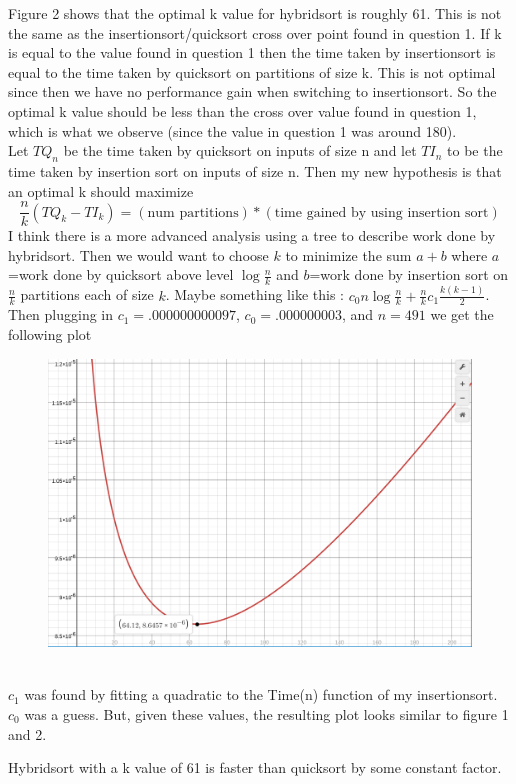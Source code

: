 \documentclass[12pt]{article}
\theoremstyle{definition}
\newenvironment{question}[1]
  {\renewcommand\theinnercustomthm{#1}\innercustomthm}
  {\endinnercustomthm}
\begin{document}
\begin{question}{Discussion}
    Figure 2 shows that the optimal k value for hybridsort is roughly 61.
    This is not the same as the insertionsort/quicksort cross over point found in question 1.
    If k is equal to the value found in question 1 then the time taken by insertionsort is equal to the time taken by quicksort on partitions of size k.
    This is not optimal since then we have no performance gain when switching to insertionsort.
    So the optimal k value should be less than the cross over value found in question 1, which is what we observe (since the value in question 1 was around 180).
    \\
    Let $TQ_n$ be the time taken by quicksort on inputs of size n and let $TI_n$ to be the time taken by insertion sort on inputs of size n.
    Then my new hypothesis is that an optimal k should maximize
    $$\frac{n}{k}(TQ_k - TI_k)  =(\text{num partitions})*(\text{time gained by using insertion sort})$$
    I think there is a more advanced analysis using a tree to describe work done by hybridsort.
    Then we would want to choose $k$ to minimize the sum $a+b$ where $a$=work done by quicksort above level $\log{\frac{n}{k}}$ and $b$=work done by insertion sort on $\frac{n}{k}$ partitions each of size $k$.
    Maybe something like this : $c_0n\log{\frac{n}{k}}+\frac{n}{k}c_1\frac{k(k-1)}{2}$.
    Then plugging in $c_1=.000000000097$, $c_0=.000000003$, and $n=491$ we get the following plot\\
\begin{figure}[h]
  \centering
  \includegraphics[width=\textwidth]{asdf.png}
  \caption{}
  \label{fig:boat3}
\end{figure}
\\
    $c_1$ was found by fitting a quadratic to the Time(n) function of my insertionsort.
    $c_0$ was a guess.
    But, given these values, the resulting plot looks similar to figure 1 and 2.

\end{question}

\begin{question}{Conclusion}
    Hybridsort with a k value of 61 is faster than quicksort by some constant factor.
\end{question}
\end{document}
